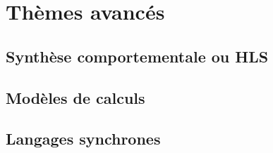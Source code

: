 \chapter{Thèmes avancés}
\minitoc
\section{Synthèse comportementale ou HLS}
\section{Modèles de calculs}
\section{Langages synchrones}
